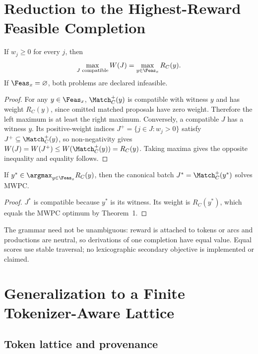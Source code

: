 \section{Reduction to the Highest-Reward Feasible Completion}
\label{sec:reducao}

\begin{theorem}
If $w_j\geq 0$ for every $j$, then
\begin{equation}
\max_{J\text{ compatible}}W(J)
=
\max_{y\in\Feas_x}R_C(y).
\label{eq:equiv}
\end{equation}
If $\Feas_x=\varnothing$, both problems are declared infeasible.
\end{theorem}

\begin{proof}
For any $y\in\Feas_x$, $\Match_C^+(y)$ is compatible with witness $y$ and has weight $R_C(y)$, since omitted matched proposals have zero weight. Therefore the left maximum is at least the right maximum. Conversely, a compatible $J$ has a witness $y$. Its positive-weight indices $J^+=\{j\in J:w_j>0\}$ satisfy $J^+\subseteq\Match_C^+(y)$, so non-negativity gives $W(J)=W(J^+)\leq W(\Match_C^+(y))=R_C(y)$. Taking maxima gives the opposite inequality and equality follows.
\end{proof}

\begin{corollary}
If $y^*\in\argmax_{y\in\Feas_x}R_C(y)$, then the canonical batch $J^*=\Match_C^+(y^*)$ solves MWPC.
\end{corollary}

\begin{proof}
$J^*$ is compatible because $y^*$ is its witness. Its weight is $R_C(y^*)$, which equals the MWPC optimum by Theorem~1.
\end{proof}

The grammar need not be unambiguous: reward is attached to tokens or arcs and productions are neutral, so derivations of one completion have equal value. Equal scores use stable traversal; no lexicographic secondary objective is implemented or claimed.

\section{Generalization to a Finite Tokenizer-Aware Lattice}
\label{sec:lattice}

\subsection{Token lattice and provenance}

